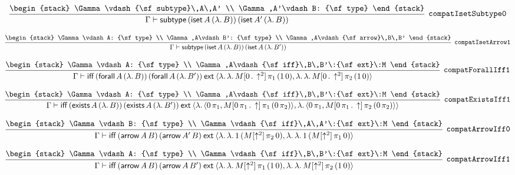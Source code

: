\[
\infer[{\tt compatIsetSubtype0}]{\Gamma \vdash {\sf subtype}\,({\sf iset}\,A\,(\lambda .\,B))\,({\sf iset}\,A'\,(\lambda .\,B))}{
\begin{stack}
\Gamma \vdash {\sf subtype}\,A\,A'
\\
\Gamma ,A'\vdash B: {\sf type}
\end{stack}}
\]

\[
\infer[{\tt compatIsetArrow1}]{\Gamma \vdash {\sf subtype}\,({\sf iset}\,A\,(\lambda .\,B))\,({\sf iset}\,A\,(\lambda .\,B'))}{
\begin{stack}
\Gamma \vdash A: {\sf type}
\\
\Gamma ,A\vdash B': {\sf type}
\\
\Gamma ,A\vdash {\sf arrow}\,B\,B'
\end{stack}}
\]

\[
\infer[{\tt compatForallIff1}]{\Gamma \vdash {\sf iff}\,({\sf forall}\,A\,(\lambda .\,B))\,({\sf forall}\,A\,(\lambda .\,B'))\:{\sf ext}\:\langle \lambda .\,\lambda .\,M[0\,.\,\uparrow^2]\, \pi_1\,(1\,0),\lambda .\,\lambda .\,M[0\,.\,\uparrow^2]\, \pi_2\,(1\,0)\rangle }{
\begin{stack}
\Gamma \vdash A: {\sf type}
\\
\Gamma ,A\vdash {\sf iff}\,B\,B'\:{\sf ext}\:M
\end{stack}}
\]

\[
\infer[{\tt compatExistsIff1}]{\Gamma \vdash {\sf iff}\,({\sf exists}\,A\,(\lambda .\,B))\,({\sf exists}\,A\,(\lambda .\,B'))\:{\sf ext}\:\langle \lambda .\,\langle 0\, \pi_1,M[0\, \pi_1\,.\,\uparrow ]\, \pi_1\,(0\, \pi_2)\rangle ,\lambda .\,\langle 0\, \pi_1,M[0\, \pi_1\,.\,\uparrow ]\, \pi_2\,(0\, \pi_2)\rangle \rangle }{
\begin{stack}
\Gamma \vdash A: {\sf type}
\\
\Gamma ,A\vdash {\sf iff}\,B\,B'\:{\sf ext}\:M
\end{stack}}
\]

\[
\infer[{\tt compatArrowIff0}]{\Gamma \vdash {\sf iff}\,({\sf arrow}\,A\,B)\,({\sf arrow}\,A'\,B)\:{\sf ext}\:\langle \lambda .\,\lambda .\,1\,(M[\uparrow^2]\, \pi_2\,0),\lambda .\,\lambda .\,1\,(M[\uparrow^2]\, \pi_1\,0)\rangle }{
\begin{stack}
\Gamma \vdash B: {\sf type}
\\
\Gamma \vdash {\sf iff}\,A\,A'\:{\sf ext}\:M
\end{stack}}
\]

\[
\infer[{\tt compatArrowIff1}]{\Gamma \vdash {\sf iff}\,({\sf arrow}\,A\,B)\,({\sf arrow}\,A\,B')\:{\sf ext}\:\langle \lambda .\,\lambda .\,M[\uparrow^2]\, \pi_1\,(1\,0),\lambda .\,\lambda .\,M[\uparrow^2]\, \pi_2\,(1\,0)\rangle }{
\begin{stack}
\Gamma \vdash A: {\sf type}
\\
\Gamma \vdash {\sf iff}\,B\,B'\:{\sf ext}\:M
\end{stack}}
\]

